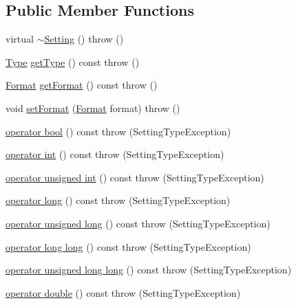 \subsection*{Public Member Functions}
\begin{DoxyCompactItemize}
\item 
virtual \hyperlink{classlibconfig_1_1_setting_a0bbd671a6c8581a6cb1dc1ade1459ba2}{$\sim$Setting} ()  throw ()
\item 
\hyperlink{classlibconfig_1_1_setting_a42f760ff88654e784477a6f040267bb4}{Type} \hyperlink{classlibconfig_1_1_setting_a729cf1d7d90b5dca9eebde2bda9176f5}{getType} () const   throw ()
\item 
\hyperlink{classlibconfig_1_1_setting_a35034c3fd8c1b2e8e590b6f53083106e}{Format} \hyperlink{classlibconfig_1_1_setting_a09b1a13a09680ff220bb5aef3e378d89}{getFormat} () const   throw ()
\item 
void \hyperlink{classlibconfig_1_1_setting_aa3d550a5658d40655113497a17c9d282}{setFormat} (\hyperlink{classlibconfig_1_1_setting_a35034c3fd8c1b2e8e590b6f53083106e}{Format} format)  throw ()
\item 
\hyperlink{classlibconfig_1_1_setting_ad8adda53b1f1021da61d00e27637a88f}{operator bool} () const   throw (SettingTypeException)
\item 
\hyperlink{classlibconfig_1_1_setting_abc59b9a6df51024d52970f0ee10d4f1f}{operator int} () const   throw (SettingTypeException)
\item 
\hyperlink{classlibconfig_1_1_setting_a9cc112e6bfab4902355fafe9ae8babac}{operator unsigned int} () const   throw (SettingTypeException)
\item 
\hyperlink{classlibconfig_1_1_setting_a0ac82df2307935191fed61ea2430bed4}{operator long} () const   throw (SettingTypeException)
\item 
\hyperlink{classlibconfig_1_1_setting_a0d6a7a8f1443d918478b9096590fe5ec}{operator unsigned long} () const   throw (SettingTypeException)
\item 
\hyperlink{classlibconfig_1_1_setting_abd5bac17fa972df2d4b909594325134f}{operator long long} () const   throw (SettingTypeException)
\item 
\hyperlink{classlibconfig_1_1_setting_a4a297e1c19d6d37d0ba067ba892d86ea}{operator unsigned long long} () const   throw (SettingTypeException)
\item 
\hyperlink{classlibconfig_1_1_setting_a79a41bbda6c9cd9f50c5820032424874}{operator double} () const   throw (SettingTypeException)
\item 

\end{DoxyCompactItemize}
